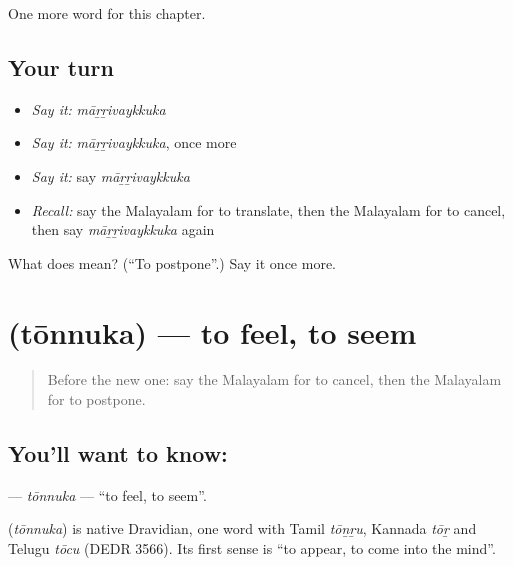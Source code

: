 \begin{grammarlens}[title={What you've built}]
One more word for this chapter.
\end{grammarlens}

\subsection*{Your turn}
\begin{itemize}
\raggedright
  \item \emph{Say it:} \emph{māṟṟivaykkuka}
  \item \emph{Say it:} \emph{māṟṟivaykkuka}, once more
  \item \emph{Say it:} say \emph{māṟṟivaykkuka}
  \item \emph{Recall:} say the Malayalam for to translate, then the Malayalam for to cancel, then say \emph{māṟṟivaykkuka} again
\end{itemize}

\begin{tcolorbox}[breakable,colback=teal!4,colframe=teal!35!black,title={Before you move on}]
What does  mean? (\textquotedblleft{}To postpone\textquotedblright{}.) Say it once more.
\end{tcolorbox}
\section[\texorpdfstring{\ml{തോന്നുക} (tōnnuka)}{തോന്നുക (tōnnuka)}]{ (tōnnuka) — to feel, to seem}

\label{lesson:ML-C306-tonnuka}



\begin{quote}
Before the new one: say the Malayalam for to cancel, then the Malayalam for to postpone.
\end{quote}

\subsection*{You'll want to know: }
\textbf{} — \emph{tōnnuka} — \textquotedblleft{}to feel, to seem\textquotedblright{}.

\begin{cousinweb}
\textbf{} (\emph{tōnnuka}) is native Dravidian, one word with Tamil \emph{tōṉṟu}, Kannada \emph{tōṟ} and Telugu \emph{tōcu} (DEDR 3566). Its first sense is \textquotedblleft{}to appear, to come into the mind\textquotedblright{}.
\end{cousinweb}

